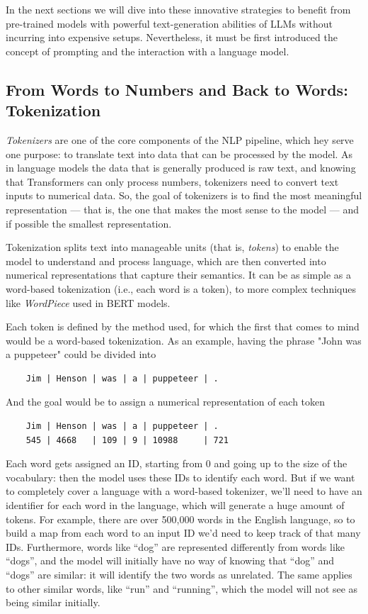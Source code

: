 In the next sections we will dive into these innovative strategies to benefit from pre-trained models with powerful text-generation abilities of LLMs without incurring into expensive setups. Nevertheless, it must be first introduced the concept of prompting and the interaction with a language model.


\subsection{From Words to Numbers and Back to Words: Tokenization}
\label{sec:tokenization}

\textit{Tokenizers} are one of the core components of the NLP pipeline, which hey serve one purpose: to translate text into data that can be processed by the model. As in language models the data that is generally produced is raw text, and knowing that Transformers can only process numbers, tokenizers need to convert text inputs to numerical data. So, the goal of tokenizers is to find the most meaningful representation — that is, the one that makes the most sense to the model — and if possible the smallest representation.

Tokenization splits text into manageable units (that is, \textit{tokens}) to enable the model to understand and process language, which are then converted into numerical representations that capture their semantics. It can be as simple as a word-based tokenization (i.e., each word is a token), to more complex techniques like \textit{WordPiece} used in BERT models.

Each token is defined by the method used, for which the first that comes to mind would be a word-based tokenization. As an example, having the phrase "John was a puppeteer" could be divided into

\begin{verbatim}
    Jim | Henson | was | a | puppeteer | .
\end{verbatim}

And the goal would be to assign a numerical representation of each token

\begin{verbatim}
    Jim | Henson | was | a | puppeteer | .
    545 | 4668   | 109 | 9 | 10988     | 721 
\end{verbatim}

Each word gets assigned an ID, starting from 0 and going up to the size of the vocabulary: then the model uses these IDs to identify each word. But if we want to completely cover a language with a word-based tokenizer, we’ll need to have an identifier for each word in the language, which will generate a huge amount of tokens. For example, there are over 500,000 words in the English language, so to build a map from each word to an input ID we’d need to keep track of that many IDs. Furthermore, words like “dog” are represented differently from words like “dogs”, and the model will initially have no way of knowing that “dog” and “dogs” are similar: it will identify the two words as unrelated. The same applies to other similar words, like “run” and “running”, which the model will not see as being similar initially. \cite{huggingfacecourse}

